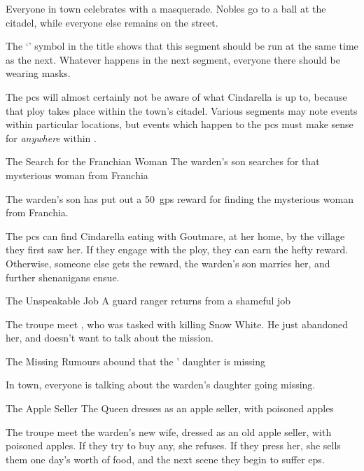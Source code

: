 \begin{multicols}{2}
Everyone in town celebrates with a masquerade.
Nobles go to a ball at the citadel, while everyone else remains on the street.

The `\squash' symbol in the title shows that this \gls{segment} should be run at the same time as the next.
Whatever happens in the next \gls{segment}, everyone there should be wearing masks.

The \glspl{pc} will almost certainly not be aware of what Cindarella is up to, because that ploy takes place within the town's citadel.
Various \glspl{segment} may note events within particular locations, but events which happen to the \glspl{pc} must make sense for \textit{anywhere} within .

{The Search for the Franchian Woman}%
{The \gls{warden}'s son searches for that mysterious woman from Franchia}%

\begin{exampletext}
  The \gls{warden}'s son has put out a 50~\glspl{gp} reward for finding the mysterious woman from Franchia.
\end{exampletext}

The \glspl{pc} can find Cindarella eating with Goutmare, at her home, by the \gls{village} they first saw her.
If they engage with the ploy, they can earn the hefty reward.
Otherwise, someone else gets the reward, the \gls{warden}'s son marries her, and further shenanigans ensue.


{The Unspeakable Job}%
{A \gls{guard} \gls{ranger} returns from a shameful job}%

The troupe meet , who was tasked with killing Snow White.
He just abandoned her, and doesn't want to talk about the mission.


{The Missing }%
{Rumours abound that the ' daughter is missing}%

In town, everyone is talking about the \gls{warden}'s daughter going missing.

{The Apple Seller}%
{The Queen dresses as an apple seller, with poisoned apples}%

The troupe meet the \gls{warden}'s new wife, dressed as an old apple seller, with poisoned apples.
If they try to buy any, she refuses.
If they press her, she sells them one day's worth of food, and the next scene they begin to suffer \glspl{ep}.


\end{multicols}
